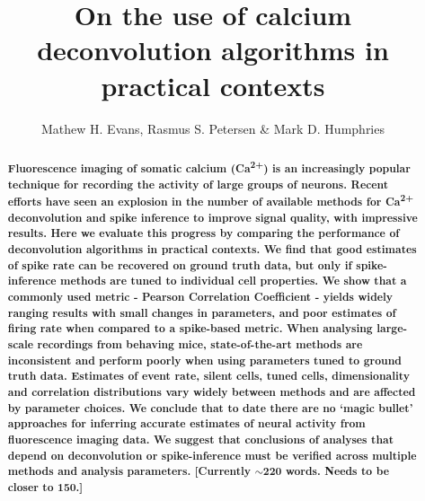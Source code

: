 \documentclass[a4paper,10pt,twocolumn]{article}
\title{\textbf{On the use of calcium deconvolution algorithms in practical contexts}}
\author{Mathew H. Evans, Rasmus S. Petersen \& Mark D. Humphries}
\begin{document}
\maketitle

\begin{abstract}

\textbf{{\color{MidnightBlue}
Fluorescence imaging of somatic calcium (Ca\textsuperscript{2+}) is an increasingly popular technique for recording the activity of large groups of neurons. Recent efforts have seen an explosion in the number of available methods for Ca\textsuperscript{2+} deconvolution and spike inference to improve signal quality, with impressive results.
Here we evaluate this progress by comparing the performance of deconvolution algorithms in practical contexts.
We find that good estimates of spike rate can be recovered on ground truth data, but only if spike-inference methods are tuned to individual cell properties. We show that a commonly used metric - Pearson Correlation Coefficient - yields widely ranging results with small changes in parameters, and poor estimates of firing rate when compared to a spike-based metric. When analysing large-scale recordings from behaving mice, state-of-the-art methods are inconsistent and perform poorly when using parameters tuned to ground truth data. Estimates of event rate, silent cells, tuned cells, dimensionality and correlation distributions vary widely between methods and are affected by parameter choices. We conclude that to date there are no `magic bullet' approaches for inferring accurate estimates of neural activity from fluorescence imaging data. We suggest that conclusions of analyses that depend on deconvolution or spike-inference must be verified across multiple methods and analysis parameters. [Currently $\sim$220 words. Needs to be closer to 150.]}}
\end{abstract}
\end{document}
